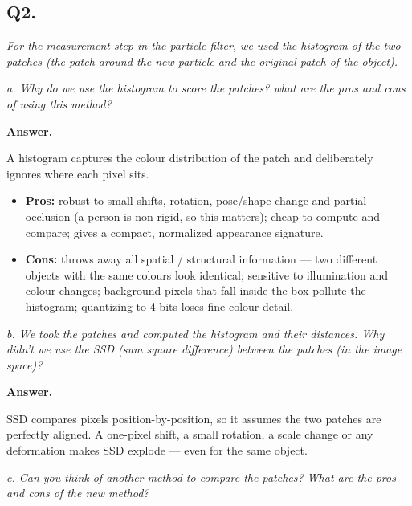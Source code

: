 \documentclass[11pt]{article}
\begin{document}
\vspace{0.5cm}

\subsection*{Q2.}
\noindent\textit{For the measurement step in the particle filter, we used the histogram of the
two patches (the patch around the new particle and the original patch of the object).}

\medskip
\noindent\textit{a. Why do we use the histogram to score the patches? what are the pros and cons
of using this method?}

\medskip
\noindent\textbf{Answer.}

A histogram captures the colour distribution of the patch and deliberately ignores where each pixel sits.

\begin{itemize}[nosep]
    \item \textbf{Pros:} robust to small shifts, rotation, pose/shape change and partial occlusion (a person is non-rigid, so this matters); cheap to compute and compare; gives a compact, normalized appearance signature.
    \item \textbf{Cons:} throws away all spatial / structural information --- two different objects with the same colours look identical; sensitive to illumination and colour changes; background pixels that fall inside the box pollute the histogram; quantizing to 4 bits loses fine colour detail.
\end{itemize}

\vspace{0.5cm}

\noindent\textit{b. We took the patches and computed the histogram and their distances. Why
didn't we use the SSD (sum square difference) between the patches (in the image space)?}

\medskip
\noindent\textbf{Answer.}

  SSD compares pixels position-by-position, so it assumes the two patches are perfectly aligned. A one-pixel shift, a small rotation, a scale change or any deformation makes SSD explode — even for the same object.
\vspace{0.5cm}

\noindent\textit{c. Can you think of another method to compare the patches? What are the pros
and cons of the new method?}
\end{document}
